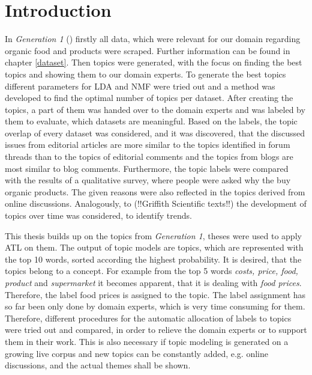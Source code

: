 %
\chapter{Introduction}

In \textit{Generation 1} (\cite{Widmer2018}) firstly all data, which were relevant for our domain regarding organic food and products were scraped. Further information can be found in chapter \ref{dataset}. Then topics were generated, with the focus on finding the best topics and showing them to our domain experts. To generate the best topics different parameters for \acf{LDA} and \acf{NMF} were tried out and a method was developed to find the optimal number of topics per dataset. After creating the topics, a part of them was handed over to the domain experts and was labeled by them to evaluate, which datasets are meaningful. Based on the labels, the topic overlap  of every dataset was considered, and it was discovered, that the discussed issues from editorial articles are more similar to the topics identified in forum threads than to the topics of editorial comments and the topics from blogs are most similar to blog comments. Furthermore, the topic labels were compared with the results of a qualitative survey, where people were asked why the buy organic products. The given reasons were also reflected in the topics derived from online discussions. Analogously, to (!!Griffith Scientific texts!!) the development of topics over time was considered, to identify trends.

This thesis builds up on the topics from \textit{Generation 1}, theses were used to apply \acf{ATL} on them. The output of topic models are topics, which are represented with the top 10 words, sorted according the highest probability. It is desired, that the topics belong to a concept. For example from the top 5 words \textit{costs, price, food, product} and \textit{supermarket} it becomes apparent, that it is dealing with \textit{food prices}. Therefore, the label food prices is assigned to the topic. The label assignment has so far been only done by domain experts, which is very time consuming for them. Therefore, different procedures for the automatic allocation of labels to topics were tried out and compared, in order to relieve the domain experts or to support them in their work. This is also necessary if topic modeling is generated on a growing live corpus and new topics can be constantly added, e.g. online discussions, and the actual themes shall be shown.

